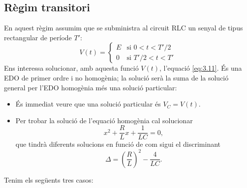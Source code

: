 \documentclass[a4paper,10.5pt]{report}
\begin{document}
\subsection{Règim transitori}
En aquest règim assumim que se subministra al circuit RLC un senyal de tipus rectangular de període $T'$:
\begin{equation}
	V(t) = 
	\begin{cases}
		E & \text{si } 0 < t < T'/2 \\
		0 & \text{si } T'/2 < t < T' \label{eq:3.20}
	\end{cases}
\end{equation}
Ens interessa solucionar, amb aquesta funció $V(t)$, l'equació \eqref{eq:3.11}. És una EDO de primer ordre i no homogènia; la solució serà la suma de la solució general per l'EDO homogènia més una solució particular:
\begin{itemize}
	\item És immediat veure que una solució particular és $V_C = V(t)$.
	\item Per trobar la solució de l'equació homogènia cal solucionar
	\begin{equation}
		x^2 + \frac{R}{L}x + \frac{1}{LC} = 0, \label{eq:3.21}
	\end{equation}
	que tindrà diferents solucions en funció de com sigui el discriminant
	\begin{equation}
		\Delta = \left(\frac{R}{L}\right)^2-\frac{4}{LC}. \label{eq:3.22}
	\end{equation}
\end{itemize}
Tenim els següents tres casos:
\end{document}
